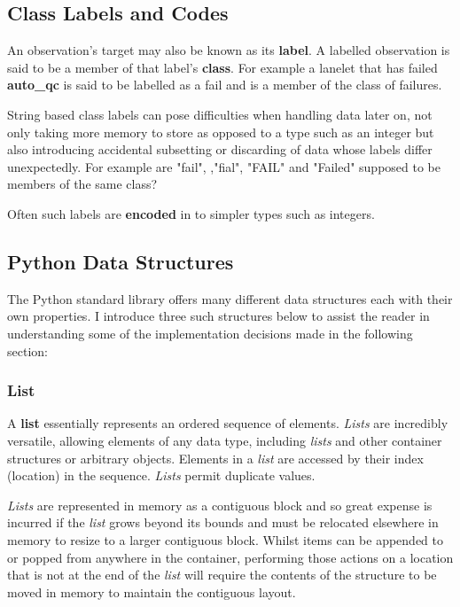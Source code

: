 \subsection{Class Labels and Codes}
\label{chap:labelcode}

An observation's target may also be known as its \textbf{label}. A labelled
observation is said to be a member of that label's \textbf{class}. For example a
lanelet that has failed \textbf{auto\_qc} is said to be labelled as a fail and
is a member of the class of failures.

String based class labels can pose difficulties when handling data later on, not
only taking more memory to store as opposed to a type such as an integer but
also introducing accidental subsetting or discarding of data whose labels differ
unexpectedly. For example are "fail", ,"fial", "FAIL" and "Failed" supposed to
be members of the same class?

Often such labels are \textbf{encoded} in to simpler types such as integers.


\subsection{Python Data Structures}
\label{sec:python-structures}

The Python standard library offers many different data structures each with
their own properties. I introduce three such structures below to assist the
reader in understanding some of the implementation decisions made in the
following section:

\subsubsection{List}
A \textbf{list}\citep{py-list} essentially represents an ordered sequence of
elements. \textit{Lists} are incredibly versatile, allowing elements of any data
type, including \textit{lists} and other container structures or arbitrary
objects. Elements in a \textit{list} are accessed by their index (location)
in the sequence. \textit{Lists} permit duplicate values.

\textit{Lists} are represented in memory as a contiguous block and so great
expense is incurred if the \textit{list} grows beyond its bounds and must be
relocated elsewhere in memory to resize to a larger contiguous block.
Whilst items can be appended to or popped from anywhere in the container,
performing those actions on a location that is not at the end of the
\textit{list} will require the contents of the structure to be moved in memory
to maintain the contiguous layout.

